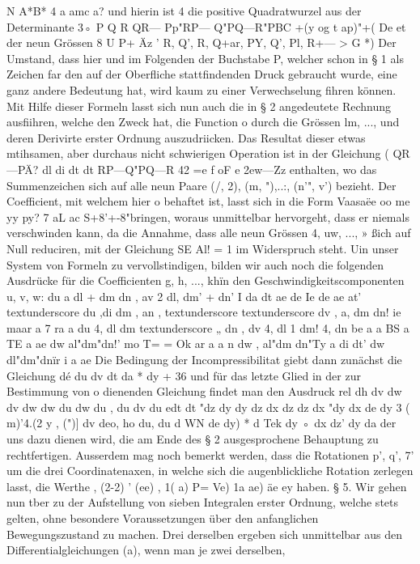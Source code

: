\documentclass[11pt]{article}
\begin{document}
N A*B* 4 a amc a? und hierin ist 4 die positive Quadratwurzel aus der Determinante
3◦ P Q R QR— Pp"RP— Q"PQ—R"PBC +(y og t ap)"+( De et der neun Grössen 8
U P+ Äz ’ R, Q’, R, Q+ar, PY, Q’, Pl, R+— > G *) Der Umstand, dass hier und im
Folgenden der Buchstabe P, welcher schon in § 1 als Zeichen far den auf der Oberfliche
stattfindenden Druck gebraucht wurde, eine ganz andere Bedeutung hat, wird kaum zu
einer Verwechselung fihren können.
Mit Hilfe dieser Formeln lasst sich nun auch die in § 2 angedeutete Rechnung ausfiihren,
welche den Zweck hat, die Function o durch die Grössen lm, ..., und deren Derivirte
erster Ordnung auszudriicken. Das Resultat dieser etwas mtihsamen, aber durchaus nicht
schwierigen Operation ist in der Gleichung ( QR—PÄ? dl di dt dt RP—Q"PQ—R 42 =e
f oF e 2ew—Zz enthalten, wo das Summenzeichen sich auf alle neun Paare (/, 2), (m,
"),..:, (n’", v’) bezieht. Der Coeﬃcient, mit welchem hier o behaftet ist, lasst sich in die
Form Vaasaëe oo me yy py? 7 aL ac S+8’+-8"bringen, woraus unmittelbar hervorgeht,
dass er niemals verschwinden kann, da die Annahme, dass alle neun Grössen 4, uw, ..., »
ßich auf Null reduciren, mit der Gleichung SE Al! = 1 im Widerspruch steht. Uin unser
System von Formeln zu vervollstindigen, bilden wir auch noch die folgenden Ausdrücke
für die Coeﬃcienten g, h, ..., khïn den Geschwindigkeitscomponenten u, v, w: du a dl +
dm dn , av 2 dl, dm’ + dn’ I da dt ae de Ie de ae at’
textunderscore du ,di dm , an ,
textunderscore
textunderscore dv , a, dm dn! ie maar a 7 ra a du 4, dl dm
textunderscore „ dn , dv 4, dl 1 dm! 4, dn be a a BS a TE a ae dw al"dm"dn!’ mo
T= = Ok ar a a n dw , al"dm dn"Ty a di dt’ dw dl"dm"dnïr i a ae Die Bedingung der
Incompressibilitat giebt dann zunächst die Gleichung dé du dv dt da * dy + 36
und für das letzte Glied in der zur Bestimmung von o dienenden Gleichung findet man
den Ausdruck rel dh dv dw dv dw dw du dw du , du dv du edt dt "dz dy dy dz dx dz
dz dx "dy dx de dy 3 ( m)’4.(2 y , (")] dv deo, ho du, du d WN de dy) * d Tek dy ◦ dx
dz’ dy da der uns dazu dienen wird, die am Ende des § 2 ausgesprochene Behauptung
zu rechtfertigen. Ausserdem mag noch bemerkt werden, dass die Rotationen p’, q’, 7’ um
die drei Coordinatenaxen, in welche sich die augenblickliche Rotation zerlegen lasst, die
Werthe , (2-2) ’ (ee) , 1( a) P= Ve) 1a ae) äe ey haben. § 5. Wir gehen nun tber zu der
Aufstellung von sieben Integralen erster Ordnung, welche stets gelten, ohne besondere
Voraussetzungen über den anfanglichen Bewegungszustand zu machen. Drei derselben
ergeben sich unmittelbar aus den Differentialgleichungen (a), wenn man je zwei derselben,
\end{document}
